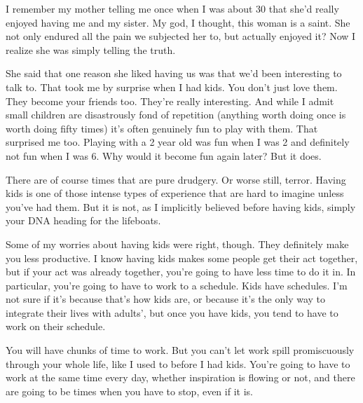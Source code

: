 I
                  remember my mother telling me once when I was about 30 that
                  she'd really enjoyed having me and my sister. My god, I
                  thought, this woman is a saint. She not only endured all the
                  pain we subjected her to, but actually enjoyed it? Now I
                  realize she was simply telling the truth.

She said
                  that one reason she liked having us was that we'd been
                  interesting to talk to. That took me by surprise when I had
                  kids. You don't just love them. They become your friends too.
                  They're really interesting. And while I admit small children
                  are disastrously fond of repetition (anything worth doing once
                  is worth doing fifty times) it's often genuinely fun to play
                  with them. That surprised me too. Playing with a 2 year old
                  was fun when I was 2 and definitely not fun when I was 6. Why
                  would it become fun again later? But it does.

There
                  are of course times that are pure drudgery. Or worse still,
                  terror. Having kids is one of those intense types of
                  experience that are hard to imagine unless you've had them.
                  But it is not, as I implicitly believed before having kids,
                  simply your DNA heading for the lifeboats.

Some of
                  my worries about having kids were right, though. They
                  definitely make you less productive. I know having kids makes
                  some people get their act together, but if your act was
                  already together, you're going to have less time to do it in.
                  In particular, you're going to have to work to a schedule.
                  Kids have schedules. I'm not sure if it's because that's how
                  kids are, or because it's the only way to integrate their
                  lives with adults', but once you have kids, you tend to have
                  to work on their schedule.

You will have chunks of
                  time to work. But you can't let work spill promiscuously
                  through your whole life, like I used to before I had kids.
                  You're going to have to work at the same time every day,
                  whether inspiration is flowing or not, and there are going to
                  be times when you have to stop, even if it is.

